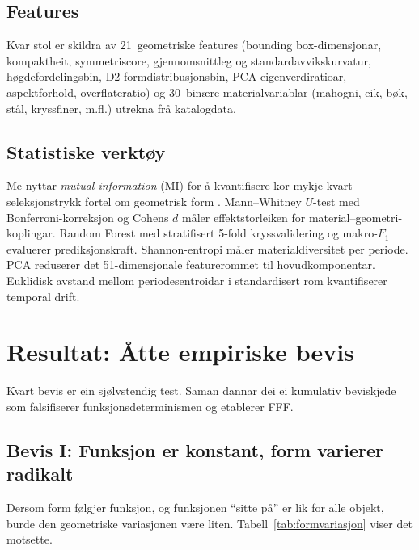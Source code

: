 \documentclass[12pt,a4paper]{article}
\begin{document}
\subsection{Features}

Kvar stol er skildra av 21~geometriske features (bounding box-dimensjonar, kompaktheit, symmetriscore, gjennomsnittleg og standardavvikskurvatur, h\o{}gdefordelingsbin, D2-formdi\-stribusjonsbin, PCA-eigenverdiratioar, aspektforhold, overflateratio) og 30~bin\ae{}re materialvariablar (mahogni, eik, b\o{}k, st\aa{}l, kryssfiner, m.fl.) utrekna fr\aa{} katalogdata.

\subsection{Statistiske verkt\o{}y}

Me nyttar \emph{mutual information} (MI) for \aa{} kvantifisere kor mykje kvart seleksjonstrykk fortel om geometrisk form \citep{cover2006}. Mann--Whitney $U$-test med Bonferroni-korreksjon og Cohens $d$ m\aa{}ler effektstorleiken for material--geometri-koplingar. Random Forest \citep{breiman2001} med stratifisert 5-fold kryssvalidering og makro-$F_1$ evaluerer prediksjonskraft. Shannon-entropi m\aa{}ler materialdiversitet per periode. PCA reduserer det 51-dimensjonale featurerommet til hovudkomponentar. Euklidisk avstand mellom periodesentroidar i standardisert rom kvantifiserer temporal drift.

\section{Resultat: \AA{}tte empiriske bevis}
\label{sec:resultat}

Kvart bevis er ein sj\o{}lvstendig test. Saman dannar dei ei kumulativ beviskjede som falsifiserer funksjonsdeterminismen og etablerer FFF.

\subsection{Bevis I: Funksjon er konstant, form varierer radikalt}
\label{sec:bevis1}

Dersom form f\o{}lgjer funksjon, og funksjonen \enquote{sitte p\aa{}} er lik for alle objekt, burde den geometriske variasjonen v\ae{}re liten. Tabell~\ref{tab:formvariasjon} viser det motsette.
\end{document}
